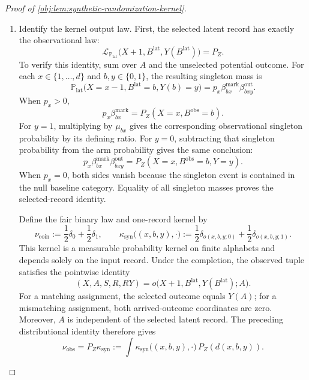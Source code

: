 \begin{proof}[Proof of \cref{obj:lem:synthetic-randomization-kernel}]
\begin{enumerate}
\item Identify the kernel output law. First, the selected latent record has exactly the observational law:
\[
\mathcal L_{\mathbb P_{\mathrm{lat}}}
\bigl(X+1,B^{\mathrm{lat}},Y(B^{\mathrm{lat}})\bigr)=P_Z.
\]
To verify this identity, sum over \(A\) and the unselected potential outcome. For each \(x\in\{1,\ldots,d\}\) and \(b,y\in\{0,1\}\), the resulting singleton mass is
\[
\mathbb P_{\mathrm{lat}}
\bigl(X=x-1,B^{\mathrm{lat}}=b,Y(b)=y\bigr)
=
p_x\beta^{\mathrm{mark}}_{bx}\beta^{\mathrm{out}}_{bxy}.
\]
When \(p_x>0\),
\[
p_x\beta^{\mathrm{mark}}_{bx}
=P_Z(X=x,B^{\mathrm{obs}}=b).
\]
For \(y=1\), multiplying by \(\mu_{bx}\) gives the corresponding observational singleton probability by its defining ratio. For \(y=0\), subtracting that singleton probability from the arm probability gives the same conclusion:
\[
p_x\beta^{\mathrm{mark}}_{bx}\beta^{\mathrm{out}}_{bxy}
=P_Z(X=x,B^{\mathrm{obs}}=b,Y=y).
\]
When \(p_x=0\), both sides vanish because the singleton event is contained in the null baseline category. Equality of all singleton masses proves the selected-record identity.

Define the fair binary law and one-record kernel by
\[
\nu_{\mathrm{coin}}:=\frac12\delta_0+\frac12\delta_1,
\qquad
\kappa_{\mathrm{syn}}\bigl((x,b,y),\cdot\bigr)
:=
\frac12\delta_{o(x,b,y;0)}
+\frac12\delta_{o(x,b,y;1)}.
\]
This kernel is a measurable probability kernel on finite alphabets and depends solely on the input record. Under the completion, the observed tuple satisfies the pointwise identity
\[
(X,A,S,R,RY)
=
o\bigl(X+1,B^{\mathrm{lat}},Y(B^{\mathrm{lat}});A\bigr).
\]
For a matching assignment, the selected outcome equals \(Y(A)\); for a mismatching assignment, both arrived-outcome coordinates are zero. Moreover, \(A\) is independent of the selected latent record. The preceding distributional identity therefore gives
\[
\nu_{\mathrm{obs}}
=
P_Z\kappa_{\mathrm{syn}}
:=
\int\kappa_{\mathrm{syn}}\bigl((x,b,y),\cdot\bigr)\,
P_Z(d(x,b,y)).
\]


\end{enumerate}
\end{proof}
